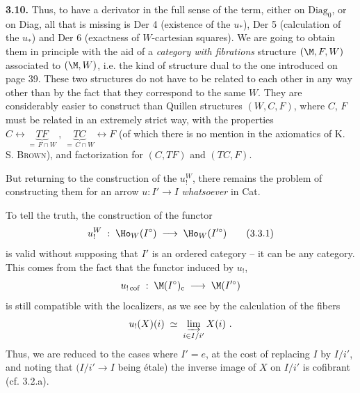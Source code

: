 \textbf{3.10.} Thus, to have a derivator in the full sense of the term, either on $\mathrm{Diag}_0$, or on Diag, all that is missing is Der 4 (existence of the $u_*$), Der 5 (calculation of the $u_*$) and Der 6 (exactness of $W$-cartesian squares). We are going to obtain them in principle with the aid of a \textit{category with fibrations} structure $(\M,F,W)$ associated to $(\M,W)$, i.e. the kind of structure dual to the one introduced %
on page 39. These two structures do not have to be related to each other in any way other than by the fact that they correspond to the same $W$. They are considerably easier to construct than Quillen structures $(W,C,F)$, where $C$, $F$ must be related in an extremely strict way, with the properties $C \longleftrightarrow \underbrace{TF}_{=\,F\cap W}\ ,\ \underbrace{TC}_{=\,C\cap W} \longleftrightarrow F$ (of which there is no mention in the axiomatics of K. S. \textsc{Brown}), and factorization for $(C,TF)$ and $(TC,F)$.

But returning to the construction of the $u_!^W$, there remains the problem of constructing them for an arrow $u : I'\longrightarrow I$ \textit{whatsoever} in Cat. %

To tell the truth, the construction of the functor
\[
u_!^W \;:\; \Ho_W(I^\circ) \;\longrightarrow\; \Ho_W(I'^\circ) \tag*{(3.3.1)}
\]
is valid without supposing that $I'$ is an ordered category – it can be any category. This comes from the fact that the functor induced by $u_!$,
\[
u_{!\,\mathrm{cof}} \;:\; \M(I^\circ)_{\mathrm{c}} \;\longrightarrow\; \M(I'^\circ)
\]
is still compatible with the localizers, as we see by the calculation of the fibers
\[
u_!(X)(i) \;\simeq\; \varinjlim_{i\in I/i'} X(i)\ . %
\]
Thus, we are reduced to the cases where $I' = e$, at the cost of replacing $I$ by $I/i'$, and noting that %
$(I/i'\longrightarrow I$ being étale) the inverse image of $X$ on $I/i'$ is cofibrant (cf. 3.2.a). %

